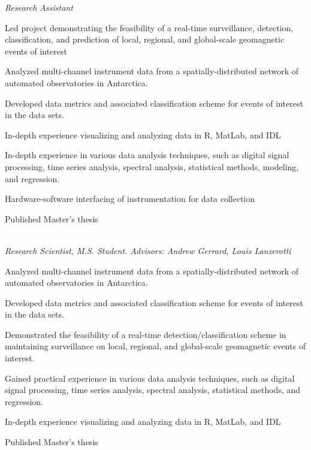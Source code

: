  \par
\textit{Research Assistant }
\vspace{-0.8em}
\begin{itemize*}
  \item Led project demonstrating the feasibility of a real-time
    surveillance, detection, classification, and prediction of 
    local, regional, and global-scale geomagnetic events of interest
  \item
    Analyzed multi-channel instrument data from a spatially-distributed
    network of automated observatories in Antarctica.
  \item Developed data metrics and associated classification scheme for
    events of interest in the data sets.
  \item In-depth experience visualizing and analyzing data in R, MatLab,
    and IDL
  \item In-depth experience in various data analysis techniques,
    such as digital signal processing, time series analysis, spectral analysis,
    statistical methods, modeling, and regression.
  \item Hardware-software interfacing of instrumentation for data
    collection
  \item Published Master's thesis
\end{itemize*}


\\  
\vspace{-0.8em}
\textit{Research Scientist, M.S. Student. Advisors: Andrew Gerrard,
Louis Lanzerotti} 
\begin{itemize*}
  \item
    Analyzed multi-channel instrument data from a spatially-distributed
    network of automated observatories in Antarctica.
  \item Developed data metrics and associated classification scheme for
    events of interest in the data sets.
  \item Demonstrated the feasibility of a real-time
    detection/classification scheme in maintaining surveillance on
    local, regional, and global-scale geomagnetic events of interest.
  \item Gained practical experience in various data analysis techniques,
    such as digital signal processing, time series analysis, spectral analysis,
    statistical methods, and regression.
  \item In-depth experience visualizing and analyzing data in R, MatLab,
    and IDL
  \item Published Master's thesis
\end{itemize*}


